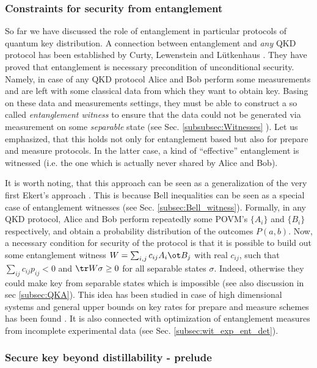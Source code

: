\documentclass[rmp,12pt,preprint]{revtex4-2}
\begin{document}
\subsubsection{Constraints for security from entanglement}

So far we have discussed the role of entanglement in particular protocols of quantum
key distribution. A connection between entanglement and {\it any} QKD protocol has been established by Curty, Lewenstein and L{\"u}tkenhaus \cite{CurtyLewLut}. They have proved that entanglement is necessary precondition of unconditional security. Namely, in case of any QKD protocol Alice and Bob perform some measurements and are left with some classical data from which they want to obtain key. Basing on these data and measurements settings, they must be able to construct a so called {\it entanglement witness} to ensure that the data could not be generated via measurement on some {\it separable} state (see Sec. \ref{subsubsec:Witnesses} ). Let us emphasized, that this holds not only for entanglement based but also for prepare and measure protocols. In the latter case, a kind of ``effective''  entanglement is witnessed (i.e. the one which is actually never shared by Alice and Bob).

It is worth noting, that this approach can be seen as a generalization of
the very first Ekert's approach \cite{E91}. This is because Bell
inequalities can be seen as a special case of entanglement witnesses
(see Sec. \ref{subsec:Bell_witness}). Formally, in any QKD protocol,
Alice and Bob perform repeatedly some POVM's $\{ A_i\}$ and $\{B_i\}$ respectively,
and obtain a probability distribution of the outcomes $P(a,b)$. Now, a necessary condition
for security of the protocol is that it is possible to build out some
entanglement witness $W=\sum_{i,j} c_{ij} A_i\ot B_j$ with real $c_{ij}$, such that
$\sum_{ij}c_{ij}p_{ij} <0$ and ${\tr}W\sigma \geq 0$ for all
separable states $\sigma$. Indeed, otherwise they could make key from
separable states which is impossible \cite{GisinWolf_linking} (see
also discussion in sec \ref{subsec:QKA}). This idea has been studied
in case of high dimensional systems
\cite{NikolopulosAlber05,NikolKhaliqueAlber05} and general upper
bounds on key rates for prepare and measure schemes has been found
\cite{MoroderCL2005-povmintr,symmetric_key_bound}. It is also
connected with optimization of entanglement measures from incomplete
experimental data (see Sec. \ref{subsec:wit_exp_ent_det}).

\subsubsection{Secure key beyond distillability - prelude}
\end{document}

